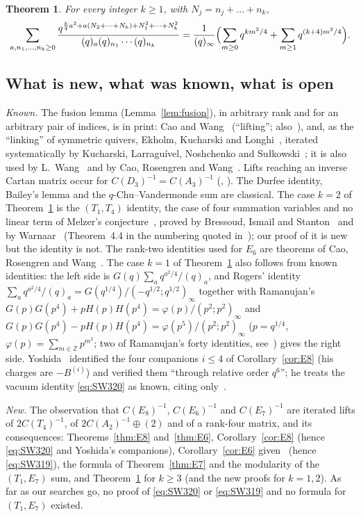 \documentclass[11pt]{amsart}
\newtheorem{theorem}{Theorem}[section]
\theoremstyle{definition}
\numberwithin{equation}{section}
\newcommand{\Z}{\mathbb{Z}}
\begin{document}
\begin{theorem}\label{thm:family}
For every integer $k\ge1$, with $N_j=n_j+\dots+n_k$,
\[
\sum_{a,n_1,\dots,n_k\ge0}\frac{q^{\frac k4a^2+a(N_2+\dots+N_k)+N_1^2+\dots+N_k^2}}{(q)_a(q)_{n_1}\cdots(q)_{n_k}}
=\frac1{(q)_\infty}\Bigl(\sum_{m\ge0}q^{km^2/4}+\sum_{m\ge1}q^{(k+4)m^2/4}\Bigr).
\]
\end{theorem}

\subsection{What is new, what was known, what is open}\label{ssec:novelty}
\emph{Known.} The fusion lemma (Lemma~\ref{lem:fusion}), in arbitrary rank and for an arbitrary pair of
indices, is in print: Cao and Wang~\cite[(1.5)--(1.6)]{CW3} (``lifting''; also~\cite{CW-lift3,CW-lift4}),
and, as the ``linking'' of symmetric quivers, Ekholm, Kucharski and Longhi~\cite[§4.5,
(4.31)--(4.36)]{EKL}, iterated systematically by Kucharski, Larragu\'ivel, Noshchenko and
Su\l kowski~\cite{KLNS}; it is also used by L.~Wang~\cite{Wang22} and by Cao, Rosengren and
Wang~\cite[(2.4)]{CRW}. Lifts reaching an inverse Cartan matrix occur for $C(D_3)^{-1}=C(A_3)^{-1}$
(\cite[§4]{WW-Dk}, \cite[§2]{SW}). The Durfee identity, Bailey's lemma and the $q$-Chu--Vandermonde sum
are classical. The case $k=2$ of Theorem~\ref{thm:family} is the $(T_1,T_4)$ identity, the case of four
summation variables and no linear term of Melzer's conjecture~\cite[(2.6)]{Melzer}, proved by Bressoud,
Ismail and Stanton~\cite[Theorem~5.1]{BIS} and by Warnaar~\cite[Theorem~4.1]{Warnaar03} (Theorem~4.4 in
the numbering quoted in~\cite{SW}); our proof of it is
new but the identity is not. The rank-two identities used for $E_6$ are theorems of Cao, Rosengren and
Wang~\cite{CRW}. The case $k=1$ of Theorem~\ref{thm:family} also follows from known identities: the left
side is $G(q)\sum_aq^{a^2/4}/(q)_a$, and Rogers' identity
$\sum_aq^{a^2/4}/(q)_a=G(q^{1/4})/(-q^{1/2};q^{1/2})_\infty$ together with Ramanujan's
$G(p)G(p^4)+pH(p)H(p^4)=\varphi(p)/(p^2;p^2)_\infty$ and $G(p)G(p^4)-pH(p)H(p^4)=\varphi(p^5)/(p^2;p^2)_\infty$
($p=q^{1/4}$, $\varphi(p)=\sum_{m\in\Z}p^{m^2}$; two of Ramanujan's forty identities, see~\cite{Forty})
gives the right side. Yoshida~\cite{Yoshida} identified the four companions $i\le4$ of
Corollary~\ref{cor:E8} (his charges are $-B^{(i)}$) and verified them ``through relative order
$q^6$''; he treats the vacuum identity \eqref{eq:SW320} as known, citing only~\cite{SW}.

\emph{New.} The observation that $C(E_8)^{-1}$, $C(E_6)^{-1}$ and $C(E_7)^{-1}$ are iterated lifts of
$2C(T_4)^{-1}$, of $2C(A_2)^{-1}\oplus(2)$ and of a rank-four matrix, and its consequences:
Theorems~\ref{thm:E8} and~\ref{thm:E6}, Corollary~\ref{cor:E8} (hence \eqref{eq:SW320} and Yoshida's
companions), Corollary~\ref{cor:E6} given~\cite{CRW} (hence \eqref{eq:SW319}), the formula of
Theorem~\ref{thm:E7} and the modularity of the $(T_1,E_7)$ sum, and Theorem~\ref{thm:family} for
$k\ge3$ (and the new proofs for $k=1,2$). As far as our searches go, no proof of \eqref{eq:SW320} or \eqref{eq:SW319} and no formula for
$(T_1,E_7)$ existed.
\end{document}
